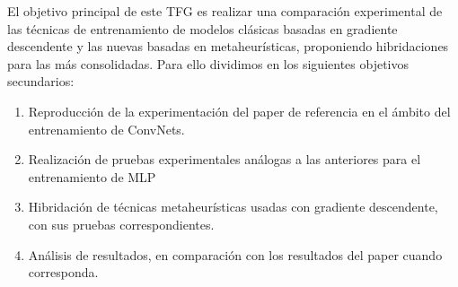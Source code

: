 El objetivo principal de este TFG es realizar una comparación experimental de las técnicas de entrenamiento de modelos clásicas basadas en gradiente descendente y las nuevas basadas en metaheurísticas, proponiendo hibridaciones para las más consolidadas. Para ello dividimos en los siguientes objetivos secundarios:


\begin{enumerate}

\item Reproducción de la experimentación del paper de referencia en el ámbito del entrenamiento de ConvNets.

\item Realización de pruebas experimentales análogas a las anteriores para el entrenamiento de MLP

\item Hibridación de técnicas metaheurísticas usadas con gradiente descendente, con sus pruebas correspondientes.

\item Análisis de resultados, en comparación con los resultados del paper cuando corresponda.

\end{enumerate}
